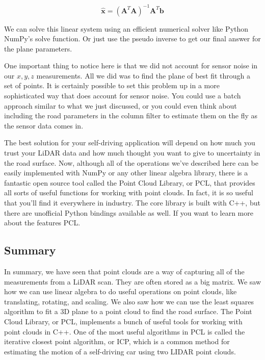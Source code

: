 \begin{equation}
\hat{\mathbf{x}} = (\mathbf{A}^T\mathbf{A})^{-1}\mathbf{A}^T\mathbf{b}
\end{equation}


We can solve this linear system using
an efficient numerical solver like Python NumPy's solve function. Or just use the pseudo inverse to get our
final answer for the plane parameters. 

One important thing to notice here is that we did not account for sensor noise in our $x, y, z$ measurements. All we did was to find the plane
of best fit through a set of points. It is certainly possible to set this
problem up in a more sophisticated way that does account for sensor noise. You could use a batch approach
similar to what we just discussed, or you could even think about including the
road parameters in the column filter to estimate them on the fly as
the sensor data comes in. 

The best solution for your self-driving application will depend
on how much you trust your LiDAR data and how much thought you want to give
to uncertainty in the road surface. Now, although all of the operations we've
described here can be easily implemented with NumPy or any other linear algebra library, there is a fantastic open source tool
called the Point Cloud Library, or PCL, that provides all sorts of useful
functions for working with point clouds. In fact, it is so useful that you'll
find it everywhere in industry. The core library is built with C++, but there are unofficial Python
bindings available as well. If you want to learn more
about the features PCL.

\subsection{Summary}

In summary, we have seen that point
clouds are a way of capturing all of the measurements from a LiDAR scan. They are often stored as a big matrix. We saw how we can use linear algebra to
do useful operations on point clouds, like translating, rotating, and scaling. We also saw how we can use
the least squares algorithm to fit a 3D plane to a point cloud
to find the road surface. The Point Cloud Library, or PCL,
implements a bunch of useful tools for working with point clouds in C++. One of the most useful algorithms in PCL
is called the iterative closest point algorithm, or ICP,
which is a common method for estimating the motion of a self-driving
car using two LIDAR point clouds. 


